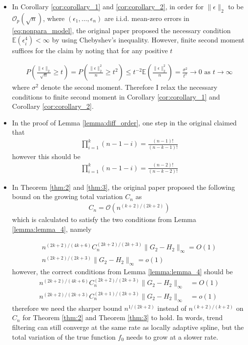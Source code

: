 \documentclass[a4paper]{article}
\renewcommand{\cal}{\mathcal}
\newcommand{\E}{\mathbb{E}}
\begin{document}
\begin{itemize}
\item In Corollary \ref{cor:corollary_1} and \ref{cor:corollary_2}, in order for $\|\epsilon\|_2$ to be $\cal{O}_p(\sqrt{n})$, where $(\epsilon_1,\ldots,\epsilon_n)$ are i.i.d. mean-zero errors in \eqref{eq:nonpara_model}, the original paper proposed the necessary condition $\E(\epsilon_i^4)<\infty$ by using Chebyshev's inequality. However, finite second moment suffices for the claim by noting that for any positive $t$

\begin{align*}
P(\frac{\|\epsilon\|_2}{\sqrt{n}}\geq t) = P(\frac{\|\epsilon\|_2^2}{n}\geq t^2) \leq t^{-2}\E(\frac{\|\epsilon\|_2^2}{n}) = \frac{\sigma^2}{t^2} \rightarrow 0 \text{ as } t\rightarrow \infty
\end{align*}
where $\sigma^2$ denote the second moment. Therefore I relax the necessary conditions to finite second moment in Corollary \ref{cor:corollary_1} and Corollary \ref{cor:corollary_2}.

\item In the proof of Lemma \ref{lemma:diff_order}, one step in the original claimed that
\begin{align*}
\prod_{i=1}^k (n-1-i) = \frac{(n-1)!}{(n-k-1)!}
\end{align*}
however this should be
\begin{align*}
\prod_{i=1}^k (n-1-i) = \frac{(n-2)!}{(n-k-2)!}
\end{align*}

\item In Theorem \ref{thm:2} and \ref{thm:3}, the original paper proposed the following bound on the growing total variation $C_n$ as
\begin{align*}
C_n = \cal{O}(n^{(k+2)/(2k+2)})
\end{align*}
which is calculated to satisfy the two conditions from Lemma \ref{lemma:lemma_4}, namely

\begin{align*}
n^{(2k+2)/(4k+6)}C_n^{(2k+2)/(2k+3)}\|G_2-H_2\|_\infty = O(1)\\
n^{(2k+2)/(2k+3)}\|G_2-H_2\|_\infty  = o(1)
\end{align*}
however, the correct conditions from Lemma \ref{lemma:lemma_4} should be
\begin{align*}
n^{(2k+2)/(4k+6)}C_n^{(2k+2)/(2k+3)}\|G_2-H_2\|_\infty &= O(1)\\
n^{(2k+2)/(2k+3)}C_n^{(2k+1)/(2k+3)}\|G_2-H_2\|_\infty &= o(1)
\end{align*}
therefore we need the sharper bound $n^{1/(2k+2)}$ instead of $n^{(k+2)/(k+2)}$ on $C_n$ for Theorem \ref{thm:2} and Theorem \ref{thm:3} to hold. In words, trend filtering can still converge at the same rate as locally adaptive spline, but the total variation of the true function $f_0$ needs to grow at a slower rate.
\end{itemize}
\end{document}
